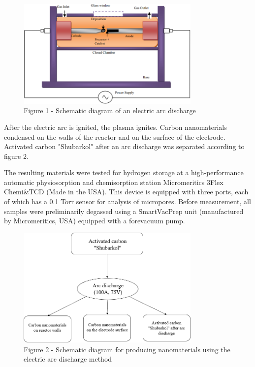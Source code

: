 \begin{figure}[H]
	\centering
	\includegraphics[width=0.8\textwidth]{assets/53}
	\caption*{Figure 1 - Schematic diagram of an electric arc discharge}
\end{figure}

\begin{multicols}{2}
After the electric arc is ignited, the plasma ignites. Carbon
nanomaterials condensed on the walls of the reactor and on the surface
of the electrode. Activated carbon "Shubarkol" after an arc discharge
was separated according to figure 2.

The resulting materials were tested for hydrogen storage at a
high-performance automatic physiosorption and chemisorption station
Micromeritics 3Flex Chemi\&TCD (Made in the USA). This device is
equipped with three ports, each of which has a 0.1 Torr sensor for
analysis of micropores. Before measurement, all samples were
preliminarily degassed using a SmartVacPrep unit (manufactured by
Micromeritics, USA) equipped with a forevacuum pump.
\end{multicols}

\begin{figure}[H]
	\centering
	\includegraphics[width=0.8\textwidth]{assets/54}
	\caption*{Figure 2 - Schematic diagram for producing nanomaterials using the electric arc discharge method}
\end{figure}

